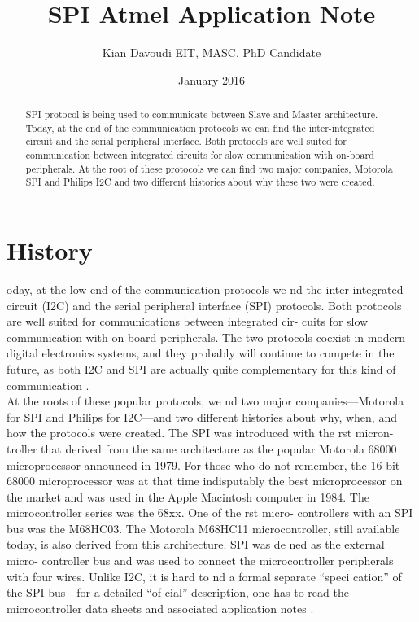 \documentclass{IEEEtran}
\title{SPI Atmel Application Note}
\author{Kian Davoudi EIT, MASC, PhD Candidate}
\date{January 2016}
\begin{document}
\maketitle

\begin{abstract}
SPI protocol is being used to communicate between Slave and Master architecture. Today, at the end of the communication protocols we can find the inter-integrated circuit and the serial peripheral interface. Both protocols are well suited for communication between integrated circuits for slow communication with on-board peripherals. At the root of these protocols we can find two major companies, Motorola SPI and Philips I2C and two different histories about why these two were created.  
\end{abstract}

\section{History}
oday, at the low end of the communication protocols we  nd the inter-integrated circuit (I2C) and the serial peripheral interface (SPI) protocols. Both protocols are well suited for communications between integrated cir- cuits for slow communication with on-board peripherals. The two protocols coexist in modern digital electronics systems, and they probably will continue to compete in the future, as both I2C and SPI are actually quite complementary for this kind of communication \cite{leens2009introduction}.\\
At the roots of these popular protocols, we  nd two major companies—Motorola for SPI and Philips for I2C—and two different histories about why, when, and how the protocols were created. The SPI was introduced with the  rst micron- troller that derived from the same architecture as the popular Motorola 68000 microprocessor announced in 1979. For those who do not remember, the 16-bit 68000 microprocessor was at that time indisputably the best microprocessor on the market and was used in the Apple Macintosh computer in 1984. The microcontroller series was the 68xx. One of the  rst micro- controllers with an SPI bus was the M68HC03. The Motorola M68HC11 microcontroller, still available today, is also derived from this architecture. SPI was de ned as the external micro- controller bus and was used to connect the microcontroller peripherals with four wires. Unlike I2C, it is hard to  nd a formal separate “speci cation” of the SPI bus—for a detailed “of cial” description, one has to read the microcontroller data sheets and associated application notes \cite{leens2009introduction}.
\end{document}
